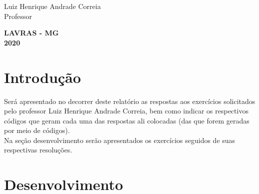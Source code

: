 \documentclass[oneside,a4paper,12pt]{article}
\newcommand{\professor}{Luiz Henrique Andrade Correia}
\begin{document}
\vspace{110pt}

\begin{center}
    \onehalfspacing
    \professor\\
    Professor
\end{center}

\vspace{240pt}

\begin{center}
    \textbf{LAVRAS - MG}\\
    \textbf{2020}\\
\end{center}

\newpage

\section{Introdução}
\onehalfspacing
Será apresentado no decorrer deste relatório as respostas aos exercícios solicitados pelo professor \professor, bem como indicar os respectivos códigos que geram cada uma das respostas ali colocadas (das que forem geradas por meio de códigos).\\
Na seção desenvolvimento serão apresentados os exercícios seguidos de suas respectivas resoluções.

\section{Desenvolvimento}
\onehalfspacing
\end{document}

